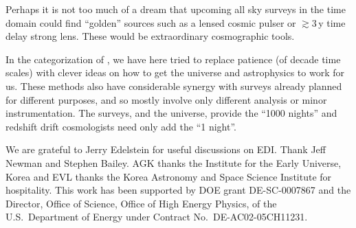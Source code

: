 \documentclass[preprint2, 10pt]{aastex}
\begin{document}
Perhaps it is not too much of a dream that upcoming all sky surveys in the 
time domain could find ``golden'' sources such as a lensed cosmic pulser 
or $\gtrsim3\,$y time delay strong lens.  These would be extraordinary 
cosmographic tools. 

In the categorization of \citet{stebbins}, we have here tried to replace 
patience (of decade time scales) with clever ideas on how to get the 
universe and astrophysics to work for us.  These methods also have 
considerable synergy with surveys already planned for different purposes, 
and so mostly involve only different analysis or minor instrumentation. 
The surveys, and the universe, provide the ``1000 nights'' and redshift 
drift cosmologists need only add the ``1 night''. 


\acknowledgments 

We are grateful to Jerry Edelstein for useful discussions on EDI.  Thank
Jeff Newman and Stephen Bailey.  AGK 
thanks the Institute for the Early Universe, Korea and EVL thanks the 
Korea Astronomy and Space Science Institute for hospitality. 
This work has been supported by DOE grant DE-SC-0007867 and the Director, 
Office of Science, Office of High Energy Physics, 
of the U.S.\ Department of Energy under Contract No.\ DE-AC02-05CH11231. 




\end{document}
